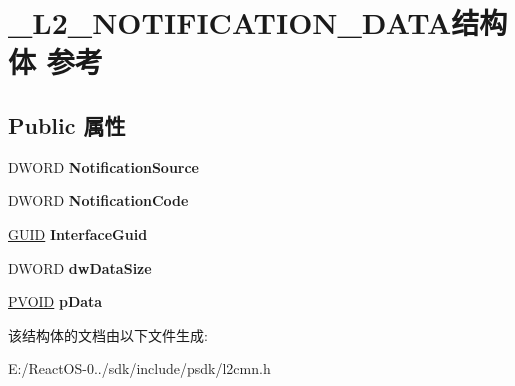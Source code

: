 \hypertarget{struct___l2___n_o_t_i_f_i_c_a_t_i_o_n___d_a_t_a}{}\section{\+\_\+\+L2\+\_\+\+N\+O\+T\+I\+F\+I\+C\+A\+T\+I\+O\+N\+\_\+\+D\+A\+T\+A结构体 参考}
\label{struct___l2___n_o_t_i_f_i_c_a_t_i_o_n___d_a_t_a}
\subsection*{Public 属性}
\begin{DoxyCompactItemize}
\item 
\mbox{\label{struct___l2___n_o_t_i_f_i_c_a_t_i_o_n___d_a_t_a_a649f2fce421285c651b55485b8b9930c}} 
D\+W\+O\+RD {\bfseries Notification\+Source}
\item 
\mbox{\label{struct___l2___n_o_t_i_f_i_c_a_t_i_o_n___d_a_t_a_a6922df58dbad914046b4143ed01e46ef}} 
D\+W\+O\+RD {\bfseries Notification\+Code}
\item 
\mbox{\label{struct___l2___n_o_t_i_f_i_c_a_t_i_o_n___d_a_t_a_a28a519ae5b43c195026c241225eec4c3}} 
\hyperlink{interface_g_u_i_d}{G\+U\+ID} {\bfseries Interface\+Guid}
\item 
\mbox{\label{struct___l2___n_o_t_i_f_i_c_a_t_i_o_n___d_a_t_a_adbef022198de386c6ce3b0ec88560e78}} 
D\+W\+O\+RD {\bfseries dw\+Data\+Size}
\item 
\mbox{\label{struct___l2___n_o_t_i_f_i_c_a_t_i_o_n___d_a_t_a_abbf796d89fe2def030aef47d2f203d79}} 
\hyperlink{interfacevoid}{P\+V\+O\+ID} {\bfseries p\+Data}
\end{DoxyCompactItemize}


该结构体的文档由以下文件生成\+:\begin{DoxyCompactItemize}
\item 
E\+:/\+React\+O\+S-\/0../sdk/include/psdk/l2cmn.\+h\end{DoxyCompactItemize}
